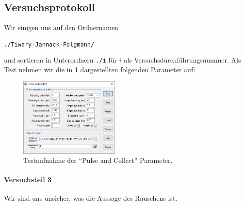 \documentclass{subfiles}
\begin{document}
    \subsection*{Versuchsprotokoll} 
        Wir einigen uns auf den Ordnernamen 
        \begin{center}
            \texttt{./Tiwary-Jannack-Folgmann/}
        \end{center}
        und sortieren in Unterordnern \texttt{./i} für $i$ als Versuchsdurchführungsnummer. Als Test nehmen wir die in \ref{fig:TestPulseAndCollect} dargestellten folgenden Parameter auf:
        \begin{figure}[H]
            \centering
            \includegraphics[width=5cm]{Bilddateien/Versuchsbilder/Testaufnahme-Pulse-And-Collect.PNG}
            \caption{Testaufnahme der \enquote{Pulse and Collect} Parameter.}
            \label{fig:TestPulseAndCollect}
        \end{figure}


        \paragraph*{Versuchsteil 3}
            Wir sind uns unsicher, was die Aussage des Rauschens ist. 
\end{document}
